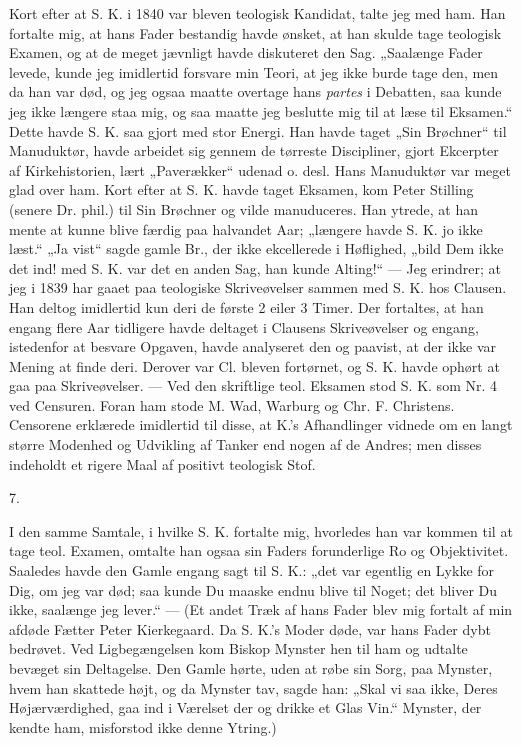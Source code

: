\documentclass[12pt,a4paper,openany]{book}
\newcommand{\secnum}[1]{\par\begin{center}#1\end{center}\par\nobreak}
\newcommand{\opage}[1]{\marginnote{\footnotesize\textit{[#1]}}}
\begin{document}
Kort efter at S. K. i 1840 var bleven teologisk
Kandidat, talte jeg med ham. Han fortalte mig, at
hans Fader bestandig havde ønsket, at han skulde tage
teologisk Examen, og at de meget jævnligt havde diskuteret
den Sag. „Saalænge Fader levede, kunde jeg
imidlertid forsvare min Teori, at jeg ikke burde tage
den, men da han var død, og jeg ogsaa maatte overtage
hans \textit{partes} i Debatten, saa kunde jeg ikke længere staa
mig, og saa maatte jeg beslutte mig til at læse til Eksamen.“
Dette havde S. K. saa gjort med stor Energi. Han havde
taget „Sin Brøchner“ til Manuduktør, havde arbeidet sig
gennem de tørreste Discipliner, gjort Ekcerpter af Kirkehistorien,
lært „Paverækker“ udenad o. desl. Hans Manuduktør
var meget glad over ham. Kort efter at S. K.
havde taget Eksamen, kom Peter Stilling (senere Dr. phil.)
til Sin Brøchner og vilde manuduceres. Han ytrede, at
han mente at kunne blive færdig paa halvandet Aar;
„længere havde S. K. jo ikke læst.“ „Ja vist“ sagde
gamle Br., der ikke ekcellerede i Høflighed, „bild Dem
ikke det ind! med S. K. var det en anden Sag, han
kunde Alting!“ --- Jeg erindrer; at jeg i 1839 har gaaet
paa teologiske Skriveøvelser sammen med S. K. hos Clausen.
Han deltog imidlertid kun deri de første 2 eiler 3 Timer.
Der fortaltes, at han engang flere Aar tidligere havde
deltaget i Clausens Skriveøvelser og engang, istedenfor
\opage{342}at besvare Opgaven, havde analyseret den og paavist, at
der ikke var Mening at finde deri. Derover var Cl. bleven
fortørnet, og S. K. havde ophørt at gaa paa Skriveøvelser.
--- Ved den skriftlige teol. Eksamen stod S. K. som Nr.
4 ved Censuren. Foran ham stode M. Wad, Warburg
og Chr. F. Christens. Censorene erklærede imidlertid
til disse, at K.’s Afhandlinger vidnede om en langt større
Modenhed og Udvikling af Tanker end nogen af de Andres;
men disses indeholdt et rigere Maal af positivt teologisk Stof.

\secnum{7.}

I den samme Samtale, i hvilke S. K. fortalte mig,
hvorledes han var kommen til at tage teol. Examen,
omtalte han ogsaa sin Faders forunderlige Ro og Objektivitet.
Saaledes havde den Gamle engang sagt til S. K.:
„det var egentlig en Lykke for Dig, om jeg var død;
saa kunde Du maaske endnu blive til Noget; det bliver
Du ikke, saalænge jeg lever.“ --- (Et andet Træk af hans
Fader blev mig fortalt af min afdøde Fætter Peter Kierkegaard.
Da S. K.’s Moder døde, var hans Fader dybt
bedrøvet. Ved Ligbegængelsen kom Biskop Mynster hen
til ham og udtalte bevæget sin Deltagelse. Den Gamle
hørte, uden at røbe sin Sorg, paa Mynster, hvem han
skattede højt, og da Mynster tav, sagde han: „Skal vi
saa ikke, Deres Højærværdighed, gaa ind i Værelset der
og drikke et Glas Vin.“ Mynster, der kendte ham, misforstod
ikke denne Ytring.)
\end{document}
